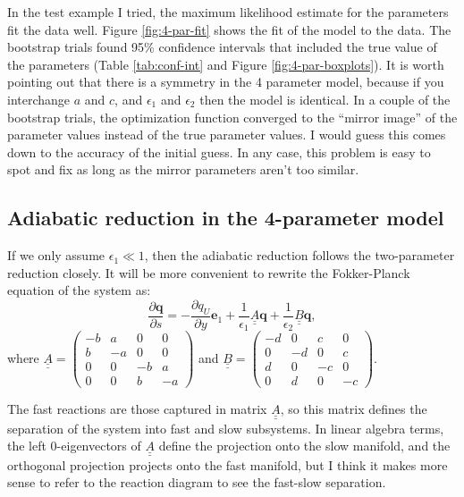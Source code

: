 \documentclass{article}
\newcommand{\Pder}[2]{\frac{\partial #1}{\partial #2}}
\begin{document}
In the test example I tried, the maximum likelihood estimate for the
parameters fit the data well. Figure \ref{fig:4-par-fit} shows the fit
of the model to the data. The bootstrap trials found 95\% confidence
intervals that included the true value of the parameters (Table
\ref{tab:conf-int} and Figure \ref{fig:4-par-boxplots}). It is worth
pointing out that there is a symmetry in the 4 parameter model,
because if you interchange $a$ and $c$, and $\epsilon_1$ and
$\epsilon_2$ then the model is identical. In a couple of the bootstrap
trials, the optimization function converged to the ``mirror image'' of
the parameter values instead of the true parameter values. I would
guess this comes down to the accuracy of the initial guess. In any
case, this problem is easy to spot and fix as long as the mirror
parameters aren't too similar.

\subsection{Adiabatic reduction in the 4-parameter model}
\label{sec:adiab-reduct-4}


If we only assume $\epsilon_1 \ll 1$, then the adiabatic reduction
follows the two-parameter reduction closely. It will be more
convenient to rewrite the Fokker-Planck equation of the system as:
\begin{equation}
  \label{eq:4-par-ad-fp}
  \Pder{\mathbf{q}}{s} = - \Pder{q_{U}}{y} \mathbf{e}_1 +
  \frac{1}{\epsilon_1} \underline{\underline{A}}\mathbf{q} +
  \frac{1}{\epsilon_2} \underline{\underline{B}}\mathbf{q},
\end{equation}
where
$\underline{\underline{A}} = \begin{pmatrix} -b & a & 0 & 0 \\ b & -a
  & 0 & 0 \\ 0 & 0 & -b & a \\ 0 & 0 & b & -a \end{pmatrix}$ and
$\underline{\underline{B}} = \begin{pmatrix} -d & 0 & c & 0 \\ 0 & -d
  & 0 & c \\ d & 0 & -c & 0 \\ 0 & d & 0 & -c \end{pmatrix}$.

The fast reactions are those captured in matrix
$\underline{\underline{A}}$, so this matrix defines the separation of
the system into fast and slow subsystems. In linear algebra terms, the
left 0-eigenvectors of $\underline{\underline{A}}$ define the
projection onto the slow manifold, and the orthogonal projection
projects onto the fast manifold, but I think it makes more sense to
refer to the reaction diagram to see the fast-slow separation.
\end{document}
